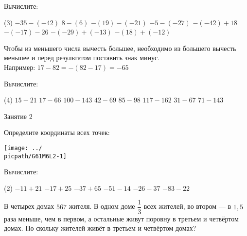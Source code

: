 \begin{class}[number=1]
\begin{listofex}[resume]
\item Вычислите:
\begin{tasks}(3)
	\task \( -35 - (-42) \)
	\task \( 8-(6) \)
	\task \( -(19)-(-21) \)
	\task \( -5-(-27) \)
	\task \( -(-42)+18 \)
	\task \( -(-17)-26 \)
	\task \( -(-29)+(-13) \)
	\task \( -(18)+(-12) \)
\end{tasks}
\end{listofex}
\begin{definit}
Чтобы из меньшего числа вычесть большее, необходимо из большего вычесть меньшее и перед результатом поставить знак минус. \\ Например: \( 17-82 = -(82-17)=-65 \)
\end{definit}
\begin{listofex}[resume]
\item Вычислите:
\begin{tasks}(4)
	\task \( 15-21 \)
	\task \( 17-66 \)
	\task \( 100-143 \)
	\task \( 42-69 \)
	\task \( 85-98 \)
	\task \( 117-162 \)
	\task \( 31-67 \)
	\task \( 71-143 \)
\end{tasks}
	\end{listofex}
\end{class}

\begin{class}[number=2]
	\begin{listofex}
		\item Занятие 2
	\end{listofex}
\end{class}

\begin{homework}[number=1]
	\begin{listofex}
		\item
		\begin{minipage}[t]{\bodywidth}
			Определите координаты всех точек:
		\end{minipage}
		\begin{minipage}[c]{0.7\linewidth}
			\texttt{[image: ../\\picpath/G61M6L2-1]}
		\end{minipage}
		\item Вычислите:
		\begin{tasks}(2)
		\task \( -11 + 21 \)
		\task \( -17+25 \)
		\task \( -37+65 \)
		\task \( -51-14 \)
		\task \( -26-37 \)
		\task \( -83-22 \)
		\end{tasks}
		\item В четырех домах \(567\) жителя. В одном доме \(\dfrac{1}{3}\) всех жителей, во втором --- в \(1,5\) раза меньше, чем в первом, а остальные живут поровну в третьем и четвёртом домах. По скольку жителей живёт в третьем и четвёртом домах?
	\end{listofex}
\end{homework}


